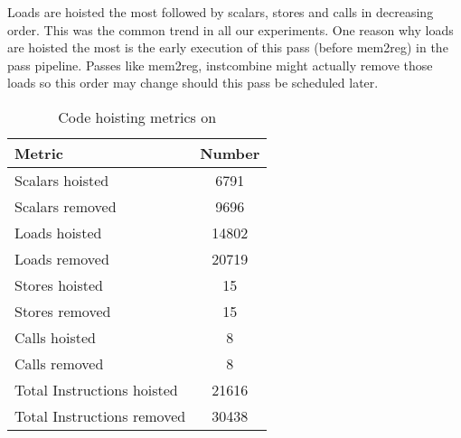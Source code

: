 \documentclass[acmlarge,review]{acmart}\settopmatter{printfolios=true}
\begin{document}
Loads are hoisted the most followed by scalars, stores and calls in decreasing
order.  This was the common trend in all our experiments. One reason why loads
are hoisted the most is the early execution of this pass (before mem2reg) in the
\LLVM{} pass pipeline. Passes like mem2reg, instcombine might actually remove
those loads so this order may change should this pass be scheduled later.

\begin{table}[h!]
  \begin{center}
    \begin{tabular}{|l|c|}
      \hline
      Metric               & Number\\\hline
      Scalars hoisted      & 6791  \\\hline
      Scalars removed      & 9696  \\\hline
      Loads hoisted        & 14802 \\\hline
      Loads removed        & 20719 \\\hline
      Stores hoisted       & 15    \\\hline
      Stores removed       & 15    \\\hline
      Calls hoisted        & 8     \\\hline
      Calls removed        & 8     \\\hline
      Total Instructions hoisted & 21616 \\\hline
      Total Instructions removed & 30438 \\\hline
\end{tabular}
  \end{center}
  \caption{Code hoisting metrics on \LLVMTestSuite{}}
  \label{tab:hoist-results}
\end{table}
\end{document}
